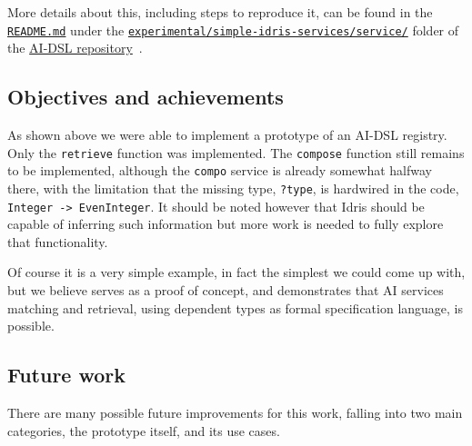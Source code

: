 \documentclass[]{report}
\begin{document}
More details about this, including steps to reproduce it, can be found
in the
\href{https://github.com/singnet/ai-dsl/blob/master/experimental/registry-dsl/README.md}{\texttt{README.md}}
under the
\href{https://github.com/singnet/ai-dsl/blob/master/experimental/registry-dsl/}{\texttt{experimental/simple-idris-services/service/}}
folder of the \href{https://github.com/singnet/ai-dsl/}{AI-DSL
  repository}~\cite{AIDSLRepo}.

\subsection{Objectives and achievements}

As shown above we were able to implement a prototype of an AI-DSL
registry.  Only the \texttt{retrieve} function was implemented.  The
\texttt{compose} function still remains to be implemented, although
the \texttt{compo} service is already somewhat halfway there, with the
limitation that the missing type, \texttt{?type}, is hardwired in the
code, \texttt{Integer -> EvenInteger}.  It should be noted however
that Idris should be capable of inferring such information but more
work is needed to fully explore that functionality.

Of course it is a very simple example, in fact the simplest we could
come up with, but we believe serves as a proof of concept, and
demonstrates that AI services matching and retrieval, using dependent
types as formal specification language, is possible.

\subsection{Future work}
\label{sec:ai_dsl_future_work}
There are many possible future improvements for this work, falling
into two main categories, the prototype itself, and its use cases.
\end{document}
